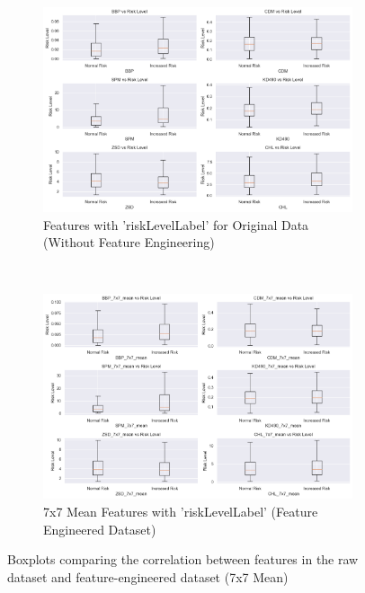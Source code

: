 \documentclass[a4paper,11pt]{report}
\begin{document}
\begin{figure}[H]
\centering
\captionsetup{width=.9\linewidth}
\begin{subfigure}[c]{\textwidth}
    \centering
    \includegraphics[width=\linewidth]{images/raw_boxplot.png}
    \caption{Features with 'riskLevelLabel' for Original Data (Without Feature Engineering)}
    \label{fig:rawbox}
\end{subfigure} \\
\vspace{5mm}      

\begin{subfigure}[c]{\textwidth}
    \centering
    \includegraphics[width=\linewidth]{images/7x7_mean_boxplot.png}
    \caption{7x7 Mean Features with 'riskLevelLabel' (Feature Engineered Dataset)}
    \label{fig:15box}
\end{subfigure}

\caption{Boxplots comparing the correlation between features in the raw dataset and feature-engineered dataset (7x7 Mean)}
\end{figure}
\end{document}
